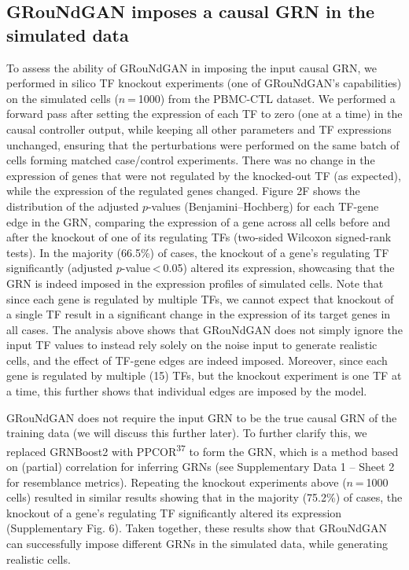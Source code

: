 \subsection*{GRouNdGAN imposes a causal GRN in the simulated data}

To assess the ability of GRouNdGAN in imposing the input causal GRN, we performed in silico TF knockout experiments (one of GRouNdGAN’s capabilities) on the simulated cells ($n$ = 1000) from the PBMC-CTL dataset. We performed a forward pass after setting the expression of each TF to zero (one at a time) in the causal controller output, while keeping all other parameters and TF expressions unchanged, ensuring that the perturbations were performed on the same batch of cells forming matched case/control experiments. There was no change in the expression of genes that were not regulated by the knocked-out TF (as expected), while the expression of the regulated genes changed. Figure 2F shows the distribution of the adjusted $p$-values (Benjamini–Hochberg) for each TF-gene edge in the GRN, comparing the expression of a gene across all cells before and after the knockout of one of its regulating TFs (two-sided Wilcoxon signed-rank tests). In the majority (66.5\%) of cases, the knockout of a gene’s regulating TF significantly (adjusted $p$-value < 0.05) altered its expression, showcasing that the GRN is indeed imposed in the expression profiles of simulated cells. Note that since each gene is regulated by multiple TFs, we cannot expect that knockout of a single TF result in a significant change in the expression of its target genes in all cases. The analysis above shows that GRouNdGAN does not simply ignore the input TF values to instead rely solely on the noise input to generate realistic cells, and the effect of TF-gene edges are indeed imposed. Moreover, since each gene is regulated by multiple (15) TFs, but the knockout experiment is one TF at a time, this further shows that individual edges are imposed by the model.

GRouNdGAN does not require the input GRN to be the true causal GRN of the training data (we will discuss this further later). To further clarify this, we replaced GRNBoost2 with PPCOR\textsuperscript{37} to form the GRN, which is a method based on (partial) correlation for inferring GRNs (see Supplementary Data 1 – Sheet 2 for resemblance metrics). Repeating the knockout experiments above ($n$ = 1000 cells) resulted in similar results showing that in the majority (75.2\%) of cases, the knockout of a gene’s regulating TF significantly altered its expression (Supplementary Fig. 6). Taken together, these results show that GRouNdGAN can successfully impose different GRNs in the simulated data, while generating realistic cells.

